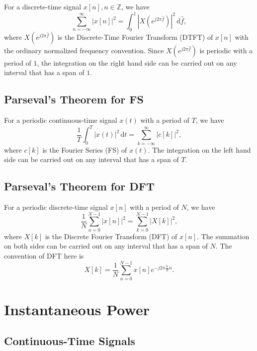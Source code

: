 \documentclass[journal,twoside]{IEEEtran}
\newcommand{\dd}{\,\mathrm{d}}
\begin{document}
For a discrete-time signal $x[n], n\in\mathbb{Z}$, we have
\begin{equation}
\sum_{n=-\infty}^{\infty}|x[n]|^2 = \int_{0}^{1}|X(e^{j 2 \pi \hat{f}})|^2\dd \hat{f},\label{eqn:parseval_DTFT}
\end{equation}
where $X(e^{j 2 \pi \hat{f}})$ is the Discrete-Time Fourier Transform (DTFT) of $x[n]$ with the ordinary normalized frequency convention. Since $X(e^{j 2 \pi \hat{f}})$ is periodic with a period of $1$, the integration on the right hand side can be carried out on any interval that has a span of $1$.

\subsection{Parseval's Theorem for FS}

For a periodic continuous-time signal $x(t)$ with a period of $T$, we have
\begin{equation}
\frac{1}{T}\int_{0}^{T}|x(t)|^2\dd t = \sum_{k=-\infty}^{\infty}|c[k]|^2,\label{eqn:parseval_FS}
\end{equation}
where $c[k]$ is the Fourier Series (FS) of $x(t)$. The integration on the left hand side can be carried out on any interval that has a span of $T$.

\subsection{Parseval's Theorem for DFT}

For a periodic discrete-time signal $x[n]$ with a period of $N$, we have
\begin{equation}
\frac{1}{N}\sum_{n=0}^{N-1}|x[n]|^2 = \sum_{k=0}^{N-1}|X[k]|^2,\label{eqn:parseval_DFT}
\end{equation}
where $X[k]$ is the Discrete Fourier Transform (DFT) of $x[n]$. The summation on both sides can be carried out on any interval that has a span of $N$. The convention of DFT here is
\begin{equation}
X[k] = \frac{1}{N}\sum_{n=0}^{N-1}x[n]e^{-j 2\pi \frac{k}{N} n}.\label{def:DFT_conv2}
\end{equation}





\section{Instantaneous Power}

\subsection{Continuous-Time Signals}
\end{document}
